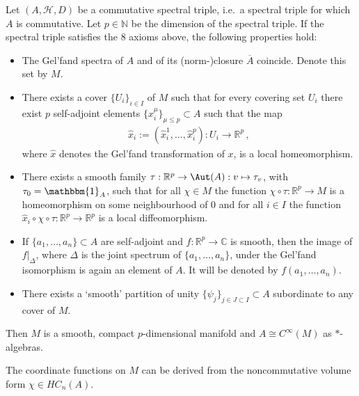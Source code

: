     \begin{construct}
        Let $(A,\mathcal{H},D)$ be a commutative spectral triple, i.e.~a spectral triple for which $A$ is commutative. Let $p\in\mathbb{N}$ be the dimension of the spectral triple. If the spectral triple satisfies the 8 axioms above, the following properties hold:
        \begin{itemize}
            \item The Gel'fand spectra of $A$ and of its (norm-)closure $\overline{A}$ coincide. Denote this set by $M$.
            \item There exists a cover $\{U_i\}_{i\in I}$ of $M$ such that for every covering set $U_i$ there exist $p$ self-adjoint elements $\{x^\mu_i\}_{\mu\leq p}\subset A$ such that the map
            \begin{gather}
                \widehat{x}_i:=(\widehat{x}^1_i,\ldots,\widehat{x}^p_i):U_i\rightarrow\mathbb{R}^p\,,
            \end{gather}
            where $\widehat{x}$ denotes the Gel'fand transformation of $x$, is a local homeomorphism.
            \item There exists a smooth family $\tau:\mathbb{R}^p\rightarrow\Aut(A):v\mapsto\tau_v$, with $\tau_0=\mathbbm{1}_A$, such that for all $\chi\in M$ the function $\chi\circ\tau:\mathbb{R}^p\rightarrow M$ is a homeomorphism on some neighbourhood of 0 and for all $i\in I$ the function $\widehat{x}_i\circ\chi\circ\tau:\mathbb{R}^p\rightarrow\mathbb{R}^p$ is a local diffeomorphism.
            \item If $\{a_1,\ldots,a_n\}\subset A$ are self-adjoint and $f:\mathbb{R}^p\rightarrow\mathbb{C}$ is smooth, then the image of $f|_\Delta$, where $\Delta$ is the joint spectrum of $\{a_1,\ldots,a_n\}$, under the Gel'fand isomorphism is again an element of $A$. It will be denoted by $f(a_1,\ldots,a_n)$.
            \item There exists a `smooth' partition of unity $\{\psi_j\}_{j\in J\subset I}\subset A$ subordinate to any cover of $M$.
        \end{itemize}
        Then $M$ is a smooth, compact $p$-dimensional manifold and $A\cong C^\infty(M)$ as $\ast$-algebras.

        The coordinate functions on $M$ can be derived from the noncommutative volume form $\chi\in HC_n(A)$.

    \end{construct}

